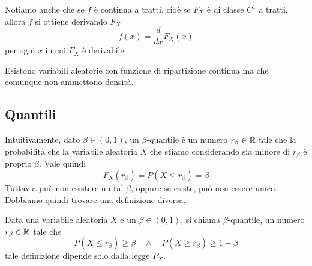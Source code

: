 \begin{center}
\end{center}

\begin{observation}
	Notiamo anche che se $f$ è continua a tratti, cioè
	se $F_X$ è di classe $C^1$ a tratti, allora $f$ si ottiene derivando $F_X$
	\[ f(x) = \frac{d}{dx} F_X (x) \]
	per ogni $x$ in cui $F_X$ è derivabile.
\end{observation}

\begin{observation}
	Esistono variabili aleatorie con funzione di ripartizione continua ma che comunque non
	ammettono densità.
\end{observation}

\subsection{Quantili}
Intuitivamente, dato $\beta \in (0,1)$, un $\beta$-quantile è un numero $r_\beta \in \mathbb{R}$ tale che
la probabilità che la variabile aleatoria $X$ che stiamo considerando sia minore di $r_\beta$ è
proprio $\beta$. Vale quindi
\[ F_X (r_\beta) = P(X \leq r_\beta) = \beta \]
Tuttavia può non esistere un tal $\beta$, oppure se esiste, può non essere unico. Dobbiamo quindi
trovare una definizione diversa.

\begin{definition}
	Data una variabile aleatoria $X$ e un $\beta \in (0,1)$, si chiama $\beta$-quantile, un numero
	$r_\beta \in \mathbb{R}$ tale che
	\[ P(X \leq r_\beta) \geq \beta \quad \land \quad P(X \geq r_\beta) \geq 1 - \beta \]
	tale definizione dipende solo dalla legge $P_X$.
\end{definition}

